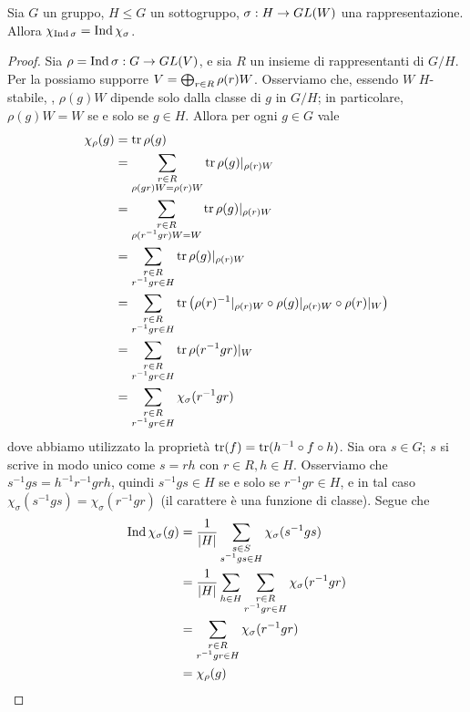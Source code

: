 \begin{proposition}
Sia $G$ un gruppo, $H\le G$ un sottogruppo, $\sigma:H\to GL(W)$ una rappresentazione. Allora $\chi_{\operatorname{Ind}\sigma}=\operatorname{Ind}\chi_\sigma$.
\end{proposition}
\begin{proof}
Sia $\rho=\operatorname{Ind}\sigma:G\to GL(V)$, e sia $R$ un insieme di rappresentanti di $G/H$. Per la  possiamo supporre $V=\bigoplus_{r\in R}\rho(r)W$. Osserviamo che, essendo $W$ $H$-stabile, , $\rho(g)W$ dipende solo dalla classe di $g$ in $G/H$; in particolare, $\rho(g)W=W$ se e solo se $g\in H$. Allora per ogni $g\in G$ vale
\begin{align*}
\chi_\rho(g)&=\operatorname{tr}\rho(g)\\
&=\sum_{\substack{r\in R\\\rho(gr)W=\rho(r)W}}\operatorname{tr}\rho(g)|_{\rho(r)W}\\
&=\sum_{\substack{r\in R\\\rho(r^{-1}gr)W=W}}\operatorname{tr}\rho(g)|_{\rho(r)W}\\
&=\sum_{\substack{r\in R\\r^{-1}gr\in H}}\operatorname{tr}\rho(g)|_{\rho(r)W}\\
&=\sum_{\substack{r\in R\\r^{-1}gr\in H}}\operatorname{tr}\left(\rho(r)^{-1}|_{\rho(r)W}\circ\rho(g)|_{\rho(r)W}\circ\rho(r)|_W\right)\\
&=\sum_{\substack{r\in R\\r^{-1}gr\in H}}\operatorname{tr}\rho(r^{-1}gr)|_W\\
&=\sum_{\substack{r\in R\\r^{-1}gr\in H}}\chi_\sigma(r^{-1}gr)
\end{align*}
dove abbiamo utilizzato la proprietà $\operatorname{tr}(f)=\operatorname{tr}(h^{-1}\circ f\circ h)$. Sia ora $s\in G$; $s$ si scrive in modo unico come $s=rh$ con $r\in R\comma h\in H$. Osserviamo che $s^{-1}gs=h^{-1}r^{-1}grh$, quindi $s^{-1}gs\in H$ se e solo se $r^{-1}gr\in H$, e in tal caso $\chi_\sigma(s^{-1}gs)=\chi_\sigma(r^{-1}gr)$ (il carattere è una funzione di classe). Segue che
\begin{align*}
\operatorname{Ind}\chi_\sigma(g)&=\frac{1}{|H|}\sum_{\substack{s\in S\\s^{-1}gs\in H}}\chi_\sigma(s^{-1}gs)\\
&=\frac{1}{|H|}\sum_{h\in H}\sum_{\substack{r\in R\\r^{-1}gr\in H}}\chi_\sigma(r^{-1}gr)\\
&=\sum_{\substack{r\in R\\r^{-1}gr\in H}}\chi_\sigma(r^{-1}gr)\\
&=\chi_\rho(g)
\end{align*}

\end{proof}

